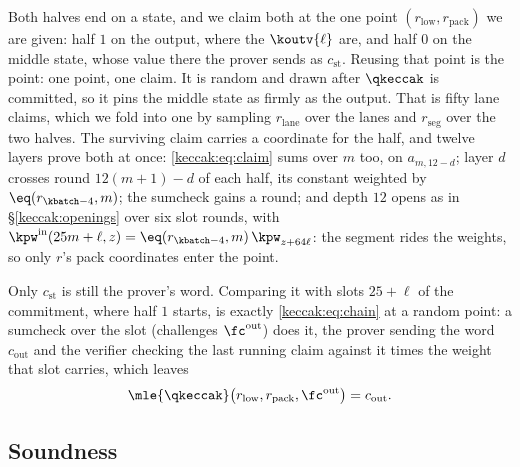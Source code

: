 Both halves end on a state, and we claim both at the one point $(r_{\mathrm{low}},r_{\mathrm{pack}})$ we are given: half $1$ on the output, where the $\koutv{\ell}$ are, and half $0$ on the middle state, whose value there the prover sends as $c_{\mathrm{st}}$. Reusing that point is the point: one point, one claim. It is random and drawn after $\qkeccak$ is committed, so it pins the middle state as firmly as the output. That is fifty lane claims, which we fold into one by sampling $r_{\mathrm{lane}}$ over the lanes and $r_{\mathrm{seg}}$ over the two halves. The surviving claim carries a coordinate for the half, and twelve layers prove both at once: \eqref{keccak:eq:claim} sums over $m$ too, on $a_{m,12-d}$; layer $d$ crosses round $12(m+1)-d$ of each half, its constant weighted by $\eq(r_{\kbatch-4},m)$; the sumcheck gains a round; and depth $12$ opens as in \S\ref{keccak:openings} over six slot rounds, with $\kpw^{\mathrm{in}}(25m+\ell,z)=\eq(r_{\kbatch-4},m)\,\kpw_{z+64\ell}$: the segment rides the weights, so only $r$'s pack coordinates enter the point.

Only $c_{\mathrm{st}}$ is still the prover's word. Comparing it with slots $25+\ell$ of the commitment, where half $1$ starts, is exactly \eqref{keccak:eq:chain} at a random point: a sumcheck over the slot (challenges $\fc^{\mathrm{out}}$) does it, the prover sending the word $c_{\mathrm{out}}$ and the verifier checking the last running claim against it times the weight that slot carries, which leaves
\begin{equation}\label{keccak:eq:out-claim}
\mle{\qkeccak}\bigl(r_{\mathrm{low}},r_{\mathrm{pack}},\fc^{\mathrm{out}}\bigr)=c_{\mathrm{out}}.
\end{equation}

\subsection{Soundness}\label{keccak:soundness}

